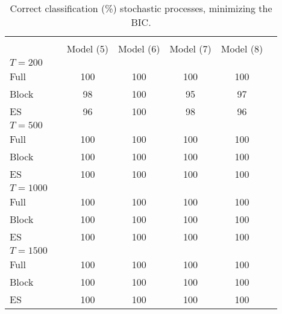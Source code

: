 \documentclass[12pt]{article}
\begin{document}
\begin{table} [H]\scriptsize
    \caption{ Correct classification (\%) stochastic processes, minimizing the BIC.}
    \begin{tabular*}{\textwidth}{@{\extracolsep{\fill}}lcccccc}
        \hline &  &  &  & &   \\ 
        &  &  Model (5) & Model (6)  & Model (7) & Model (8)  \\ 
        $T=200$  &  &  &  & &  & \\
        Full                      &  & 100  & 100 & 100 & 100  \\ 
        Block                     &  & 98 & 100 & 95 & 97 \\ 
        ES                        &  & 96 & 100 & 98 & 96 \\ 
        \hline 
        $T=500$  &  &   & & &   \\ 
        
        Full                      &  & 100 & 100 & 100 & 100 \\ 
        Block                     &  & 100 & 100 & 100 & 100  \\ 
        ES                        &  & 100 & 100 & 100 & 100 \\ 
        \hline 
        $T=1000$  &  &   &   &  &   \\ 
        
        Full                      &  & 100 & 100 & 100 & 100  \\ 
        Block                     &  & 100 & 100 & 100 & 100 \\ 
        ES                        &  & 100 & 100 & 100 & 100 \\ 
        \hline      
        $T=1500$  &  &   &   &  &   \\ 
        
        Full                      &  & 100 & 100 & 100 & 100  \\ 
        Block                     &  & 100 & 100 & 100 & 100 \\ 
        ES                        &  & 100 & 100 & 100 & 100 \\ 
        \hline      
    \end{tabular*}
\end{table}
\end{document}
